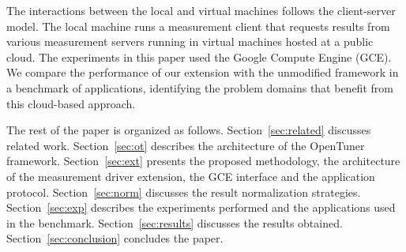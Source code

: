 The interactions between the local and virtual machines follows the
client-server model. The local machine runs a measurement client that requests
results from various measurement servers running in virtual machines hosted at
a public cloud. The experiments in this paper used the Google Compute Engine
(GCE).  We compare the performance of our extension with the unmodified
framework in a benchmark of applications, identifying the problem domains that
benefit from this cloud-based approach.

The rest of the paper is organized as follows.
Section~\ref{sec:related} discusses related work.
Section~\ref{sec:ot} describes the architecture of the OpenTuner framework.
Section~\ref{sec:ext} presents the proposed methodology, the architecture of 
the measurement driver extension, the GCE interface and the application 
protocol.
Section~\ref{sec:norm} discusses the result normalization strategies.
Section~\ref{sec:exp} describes the experiments performed and the
applications used in the benchmark.
Section~\ref{sec:results} discusses the results obtained.
Section~\ref{sec:conclusion} concludes the paper.
